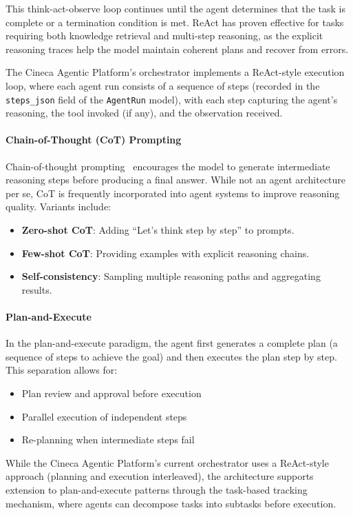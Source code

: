 \documentclass[a4paper,twoside]{sapthesis}
\begin{document}
This think-act-observe loop continues until the agent determines that the task is complete or a termination condition is met. ReAct has proven effective for tasks requiring both knowledge retrieval and multi-step reasoning, as the explicit reasoning traces help the model maintain coherent plans and recover from errors.

The Cineca Agentic Platform's orchestrator implements a ReAct-style execution loop, where each agent run consists of a sequence of steps (recorded in the \texttt{steps\_json} field of the \texttt{AgentRun} model), with each step capturing the agent's reasoning, the tool invoked (if any), and the observation received.

\paragraph{Chain-of-Thought (CoT) Prompting}
Chain-of-thought prompting~\cite{wei2022chain}
encourages the model to generate intermediate reasoning steps before producing a final answer. While not an agent architecture per se, CoT is frequently incorporated into agent systems to improve reasoning quality. Variants include:
\begin{itemize}
    \item \textbf{Zero-shot CoT}: Adding ``Let's think step by step'' to prompts.
    \item \textbf{Few-shot CoT}: Providing examples with explicit reasoning chains.
    \item \textbf{Self-consistency}: Sampling multiple reasoning paths and aggregating results.
\end{itemize}

\paragraph{Plan-and-Execute}
In the plan-and-execute paradigm, the agent first generates a complete plan (a sequence of steps to achieve the goal) and then executes the plan step by step. This separation allows for:
\begin{itemize}
    \item Plan review and approval before execution
    \item Parallel execution of independent steps
    \item Re-planning when intermediate steps fail
\end{itemize}

While the Cineca Agentic Platform's current orchestrator uses a ReAct-style approach (planning and execution interleaved), the architecture supports extension to plan-and-execute patterns through the task-based tracking mechanism, where agents can decompose tasks into subtasks before execution.
\end{document}
